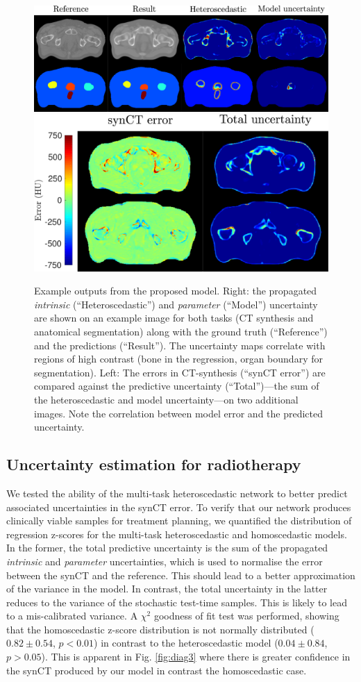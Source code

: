 \begin{figure}[!t]
	\centering
	{\includegraphics[height=0.21\textwidth]{chapter_5/figures/new_figure_1a.pdf}}%
	\hspace{3pt}
	{\includegraphics[height=0.21\textwidth]{chapter_5/figures/new_figure_1b.pdf}}%
	\caption{\footnotesize Example outputs from the proposed model. Right: the propagated \textit{intrinsic} (``Heteroscedastic'') and \textit{parameter} (``Model'') uncertainty are shown on an example image for both tasks (CT synthesis and anatomical segmentation) along with the ground truth (``Reference'') and the predictions (``Result''). The uncertainty maps correlate with regions of high contrast (bone in the regression, organ boundary for segmentation). Left: The errors in CT-synthesis (``synCT error'') are compared against the predictive uncertainty (``Total'')---the sum of the heteroscedastic and model uncertainty---on two additional images.  Note the correlation between model error and the predicted uncertainty.}
	\label{fig:diagram2}
\end{figure}


\subsection{Uncertainty estimation for radiotherapy}
We tested the ability of the multi-task heteroscedastic network to better predict associated uncertainties in the synCT error. To verify that our network produces clinically viable samples for treatment planning, we quantified the distribution of regression z-scores for the multi-task heteroscedastic and homoscedastic models. In the former, the total predictive uncertainty is the sum of the propagated \emph{intrinsic} and \emph{parameter} uncertainties, which is used to normalise the error between the synCT and the reference. This should lead to a better approximation of the variance in the model. In contrast, the total uncertainty in the latter reduces to the variance of the stochastic test-time samples. This is likely to lead to a mis-calibrated variance. A $\chi^{2}$ goodness of fit test was performed, showing that the homoscedastic z-score distribution is not normally distributed ($0.82 \pm 0.54$, $p<0.01$) in contrast to the heteroscedastic model ($0.04 \pm 0.84$, $p>0.05$). This is apparent in Fig. \ref{fig:diag3} where there is greater confidence in the synCT produced by our model in contrast the homoscedastic case.

